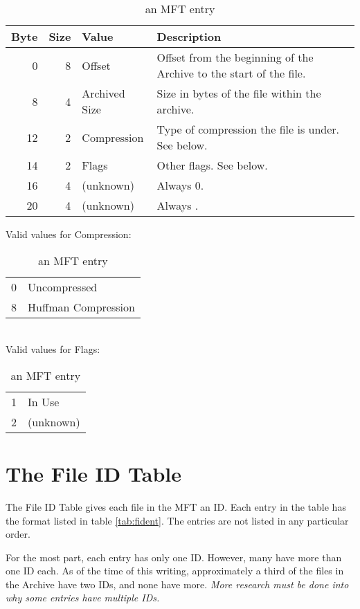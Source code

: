 \begin{table}[htbp]\begin{center}
	\caption{an MFT entry}
	\label{tab:mftent}
	
	\begin{tabular}{|r|r|l|p{2.5in}|}
		\hline
		\textbf{Byte} & \textbf{Size} & \textbf{Value} & \textbf{Description} \\
		\hline
		 0 & 8 & Offset        & Offset from the beginning of the Archive to the
		                         start of the file.  \\
		\hline
		 8 & 4 & Archived Size & Size in bytes of the file within the archive.  \\
		\hline
		12 & 2 & Compression   & Type of compression the file is under.  See below.  \\
		\hline
		14 & 2 & Flags         & Other flags.  See below.  \\
		\hline
		16 & 4 & (unknown)     & Always 0.  \\
		\hline
		20 & 4 & (unknown)     & Always \hex{4867~4BC7}.  \\
		\hline
	\end{tabular}
	
	Valid values for Compression:
	\begin{tabular}{rl}
		\hline
		0 & Uncompressed \\
		8 & Huffman Compression \\
		\hline
	\end{tabular}
	\\
	
	Valid values for Flags:
	\begin{tabular}{rl}
		\hline
		1 & In Use \\
		2 & (unknown) \\
		\hline
	\end{tabular}
\end{center}\end{table}


\section{The File ID Table}
\label{sec:fidtab}

The File ID Table gives each file in the MFT an ID.  Each entry in the table
has the format listed in table \ref{tab:fident}.  The entries are not listed in
any particular order.

For the most part, each entry has only one ID.  However, many have more than one
ID each.  As of the time of this writing, approximately a third of the files in
the Archive have two IDs, and none have more.  \emph{More research must be done
into why some entries have multiple IDs.}

